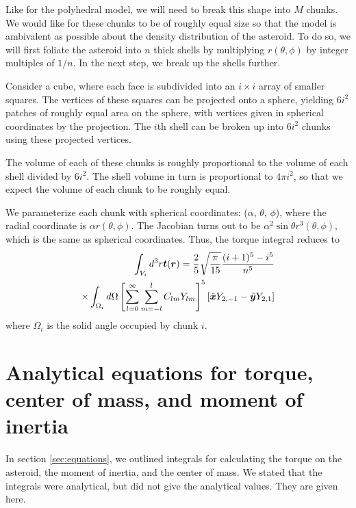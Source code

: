 \documentclass[aps,twocolumn,secnumarabic,balancelastpage,amsmath,amssymb,nofootinbib,floatfix]{revtex4-1}
\begin{document}
Like for the polyhedral model, we will need to break this shape into $M$ chunks. We would like for these chunks to be of roughly equal size so that the model is ambivalent as possible about the density distribution of the asteroid. To do so, we will first foliate the asteroid into $n$ thick shells by multiplying $r(\theta, \phi)$ by integer multiples of $1/n$. In the next step, we break up the shells further.

Consider a cube, where each face is subdivided into an $i\times i$ array of smaller squares. The vertices of these squares can be projected onto a sphere, yielding $6i^2$ patches of roughly equal area on the sphere, with vertices given in spherical coordinates by the projection. The $i$th shell can be broken up into $6i^2$ chunks using these projected vertices.

The volume of each of these chunks is roughly proportional to the volume of each shell divided by $6i^2$. The shell volume in turn is proportional to $4\pi i^2$, so that we expect the volume of each chunk to be roughly equal.



We parameterize each chunk with spherical coordinates: ($\alpha$, $\theta$, $\phi$), where the radial coordinate is $\alpha r(\theta, \phi)$. The Jacobian turns out to be $\alpha^2 \sin\theta r^3(\theta, \phi)$, which is the same as spherical coordinates. Thus, the torque integral reduces to 
\begin{equation}
    \begin{aligned}
    \int_{V_i} d^3 r \bm t(\bm r) = \frac{2}{5}\sqrt{\frac{\pi}{15}}\frac{(i+1)^5-i^5}{n^5}\\
    \times\int_{\Omega_i} d\Omega \left[ \sum_{l=0}^\infty\sum_{m=-l}^l C_{lm} Y_{lm} \right]^5\left[ \hat{\bm x} Y_{2, -1} - \hat{\bm y} Y_{2, 1} \right]
    \end{aligned}
\end{equation}
where $\Omega_i$ is the solid angle occupied by chunk $i$.



\appendix
\section{Analytical equations for torque, center of mass, and moment of inertia}
In section \ref{sec:equations}, we outlined integrals for calculating the torque on the asteroid, the moment of inertia, and the center of mass. We stated that the integrals were analytical, but did not give the analytical values. They are given here.
\end{document}
